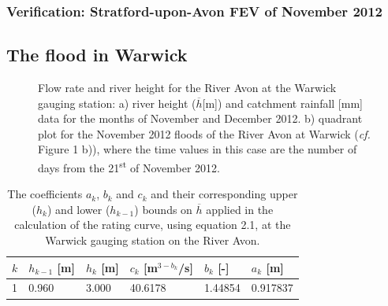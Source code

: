 \documentclass[11pt,a4paper]{article}
\begin{document}
\subsubsection{Verification: Stratford-upon-Avon FEV of November 2012}

\subsection{The flood in Warwick}
\begin{figure}[ht!]
\centering
{}
\hfill
{}
\caption{Flow rate and river height for the River Avon at the Warwick gauging station: a) river height ($\overline{h}$[m]) \cite{EA} and catchment rainfall [mm] data \cite{NRFA} for the months of November and December 2012. b) quadrant plot for the November 2012 floods of the River Avon at Warwick (\textit{cf.} Figure 1 b)), where the time values in this case are the number of days from the 21\textsuperscript{st} of November 2012.}
\end{figure}

\begin{table}[ht!]
\centering
\begin{tabular}{l|l|l|l|l|l}
$k$ & $h_{k-1}$ [m] & $h_k$ [m] & $c_k$ [m$^{3-b_k}$/s] & $b_k$ [-] & $a_k$ [m]\\
\hline
1 & 0.960 & 3.000 & 40.6178 & 1.44854 & 0.917837 \\
\end{tabular}
\caption{The coefficients $a_k$, $b_k$ and $c_k$ and their corresponding upper ($h_k$) and lower ($h_{k-1}$) bounds on $\overline{h}$ \cite{EA} applied in the calculation of the rating curve, using equation 2.1, at the Warwick gauging station on the River Avon.}
\end{table}
\end{document}
